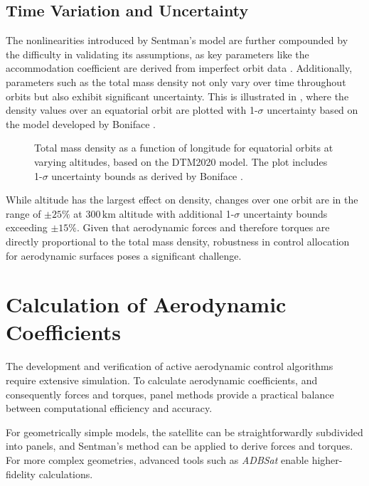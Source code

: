 \documentclass[pdflatex,sn-mathphys-num]{sn-jnl}%
\theoremstyle{thmstyleone}%
\theoremstyle{thmstyletwo}%
\theoremstyle{thmstylethree}%
\begin{document}
        \subsection{Time Variation and Uncertainty}
		\label{sec:uncertainty}
		The nonlinearities introduced by Sentman’s model are further compounded by the difficulty in validating its assumptions, as key parameters like the accommodation coefficient are derived from imperfect orbit data \cite{moeImprovedSatelliteDrag1998}. 
		Additionally, parameters such as the total mass density not only vary over time throughout orbits but also exhibit significant uncertainty. This is illustrated in , where the density values over an equatorial orbit are plotted with 1-$\sigma$ uncertainty based on the model developed by Boniface \cite{bonifaceUncertaintyQuantificationDTM20202021}.
		\begin{figure}[ht]
			\centering
			
			\caption{Total mass density as a function of longitude for equatorial orbits at varying altitudes, based on the DTM2020 model. The plot includes 1-$\sigma$ uncertainty bounds as derived by Boniface \cite{bonifaceUncertaintyQuantificationDTM20202021}.}
			\label{fig:density_uncertainty_over_orbit}
		\end{figure}
		While altitude has the largest effect on density, changes over one orbit are in the range of $\pm 25 \%$ at $300\,\text{km}$ altitude with additional 1-$\sigma$ uncertainty bounds exceeding $\pm 15\%$.
		Given that aerodynamic forces and therefore torques are directly proportional to the total mass density, robustness in control allocation for aerodynamic surfaces poses a significant challenge.

        \section{Calculation of Aerodynamic Coefficients}
	\label{sec:sim_tool}
	The development and verification of active aerodynamic control algorithms require extensive simulation. To calculate aerodynamic coefficients, and consequently forces and torques, panel methods provide a practical balance between computational efficiency and accuracy. 

	For geometrically simple models, the satellite can be straightforwardly subdivided into panels, and Sentman's method can be applied to derive forces and torques. For more complex geometries, advanced tools such as \textit{ADBSat} \cite{sinpetruADBSatMethodologyNovel2022} enable higher-fidelity calculations.
	 
\end{document}
